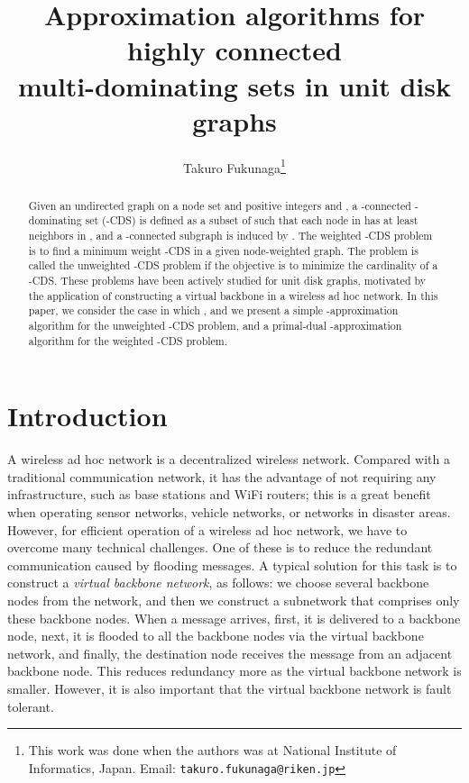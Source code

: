 \documentclass[11pt]{article}
\begin{document}
\title{Approximation algorithms for highly
connected \\ multi-dominating sets in unit disk graphs}

\author{Takuro Fukunaga\thanks{This work was done when the authors
was at National Institute of Informatics, Japan. Email: {\tt takuro.fukunaga@riken.jp}}}

\date{}


\maketitle

\begin{abstract}
  Given an undirected graph on a node set 
  and positive integers  and ,
  a -connected -dominating set (-CDS)
  is defined as a subset  of  
  such that each node in 
  has at least  neighbors in , and
 a -connected subgraph is induced by .
  The weighted -CDS problem is to
  find a minimum weight -CDS
  in a given node-weighted graph.
  The problem is called
  the unweighted -CDS problem
  if the objective
  is to minimize the cardinality of a -CDS.
  These problems
  have been actively studied for unit disk graphs,
  motivated by the application of constructing a virtual backbone 
  in a wireless ad hoc network.
In this paper,
  we consider the case in which ,
  and we present a simple
  -approximation algorithm for the unweighted -CDS
 problem,
 and a primal-dual -approximation algorithm for the
 weighted -CDS problem. 
 \end{abstract}


 
\section{Introduction}
\label{sec.intro}


A wireless ad hoc network is a decentralized wireless network.
Compared with a traditional communication
network, it has the advantage of not requiring
any infrastructure, such as base stations and WiFi routers; this is a
great benefit when operating sensor networks, vehicle networks, or
networks in disaster areas.  However, for efficient operation of a
wireless ad hoc network, we have to overcome many technical challenges.
One of these is to reduce the redundant communication caused by flooding
messages.  
A typical solution 
for this task
is to construct a
\emph{virtual backbone network}, as follows:
we choose several backbone nodes from the network,
and then we construct a subnetwork that comprises only these backbone nodes.
When a message arrives, first, it is delivered to a backbone node,
next, it is flooded to all the backbone nodes via the virtual backbone
network,
and finally, the destination node receives the message from an adjacent backbone node.
This reduces redundancy more as the virtual backbone network is
smaller.
However, it is also important that the virtual backbone network
is fault tolerant.
\end{document}
